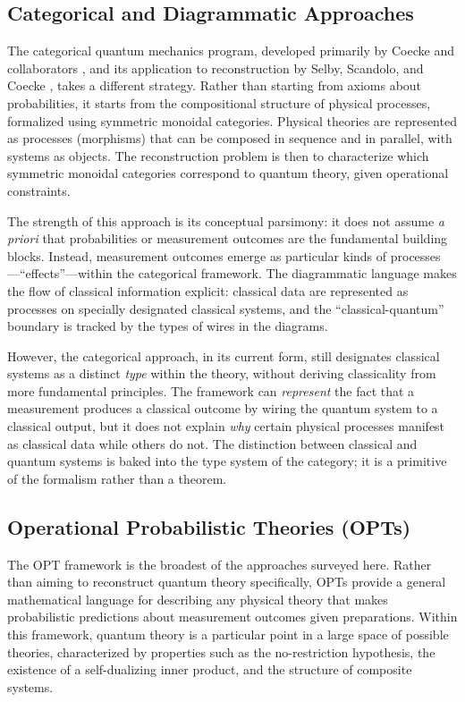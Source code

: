 \documentclass[12pt,a4paper,twoside]{article}
\begin{document}
\subsection{Categorical and Diagrammatic Approaches}

The categorical quantum mechanics program, developed primarily by Coecke and collaborators \cite{Coecke2010}, and its application to reconstruction by Selby, Scandolo, and Coecke \cite{Selby2021}, takes a different strategy. Rather than starting from axioms about probabilities, it starts from the compositional structure of physical processes, formalized using symmetric monoidal categories. Physical theories are represented as processes (morphisms) that can be composed in sequence and in parallel, with systems as objects. The reconstruction problem is then to characterize which symmetric monoidal categories correspond to quantum theory, given operational constraints.

The strength of this approach is its conceptual parsimony: it does not assume \emph{a priori} that probabilities or measurement outcomes are the fundamental building blocks. Instead, measurement outcomes emerge as particular kinds of processes---``effects''---within the categorical framework. The diagrammatic language makes the flow of classical information explicit: classical data are represented as processes on specially designated classical systems, and the ``classical-quantum'' boundary is tracked by the types of wires in the diagrams.

However, the categorical approach, in its current form, still designates classical systems as a distinct \emph{type} within the theory, without deriving classicality from more fundamental principles. The framework can \emph{represent} the fact that a measurement produces a classical outcome by wiring the quantum system to a classical output, but it does not explain \emph{why} certain physical processes manifest as classical data while others do not. The distinction between classical and quantum systems is baked into the type system of the category; it is a primitive of the formalism rather than a theorem.

\subsection{Operational Probabilistic Theories (OPTs)}

The OPT framework \cite{Barrett2007,Barnum2007} is the broadest of the approaches surveyed here. Rather than aiming to reconstruct quantum theory specifically, OPTs provide a general mathematical language for describing any physical theory that makes probabilistic predictions about measurement outcomes given preparations. Within this framework, quantum theory is a particular point in a large space of possible theories, characterized by properties such as the no-restriction hypothesis, the existence of a self-dualizing inner product, and the structure of composite systems.
\end{document}
